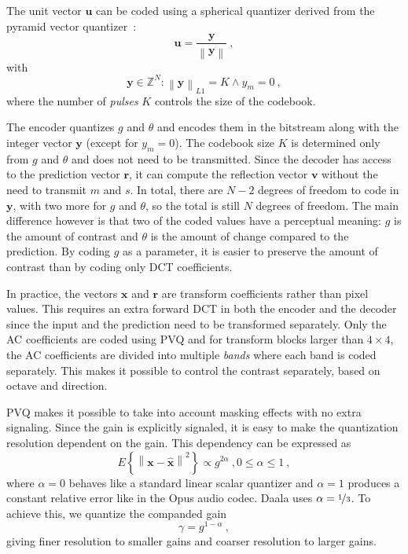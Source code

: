 \documentclass[english,conference,10pt]{IEEEtran}
\begin{document}
The unit vector $\mathbf{u}$ can be coded using a spherical quantizer derived
from the pyramid vector quantizer~\cite{Fischer1986}:
\begin{equation}
\mathbf{u}=\frac{\mathbf{y}}{\left\|\mathbf{y}\right\|}\ ,
\end{equation}
with
\begin{equation}
\mathbf{y} \in \mathbb{Z}^N : \left\|\mathbf{y}\right\|_{L1} = K \land y_m=0\ ,
\end{equation}
where the number of \textit{pulses} $K$ controls the size of the codebook.

The encoder quantizes $g$ and $\theta$ and encodes them in the bitstream along
with the integer vector $\mathbf{y}$ (except for $y_m=0$). The codebook
size $K$ is determined only from $g$ and $\theta$ and does not need to be
transmitted. Since the decoder has access to the prediction vector $\mathbf{r}$,
it can compute the reflection vector $\mathbf{v}$ without the need to transmit
$m$ and $s$. In total, there are $N-2$ degrees of freedom to code in
$\mathbf{y}$, with two more for $g$ and $\theta$, so the total is still
$N$ degrees of freedom. The main difference however is that two of the
coded values have a perceptual meaning: $g$ is the amount of contrast and
$\theta$ is the amount of change compared to the prediction. By coding $g$
as a parameter, it is easier to preserve the amount of contrast than by
coding only DCT coefficients.

In practice, the vectors $\mathbf{x}$ and $\mathbf{r}$ are transform
coefficients rather than pixel values. This requires an extra forward DCT
in both the encoder and the decoder since the input and the prediction need
to be transformed separately. Only the AC coefficients are coded using PVQ
and for transform blocks larger than $4\times 4$, the AC coefficients are divided into multiple
\textit{bands} where each band is coded separately. This makes it possible
to control the contrast separately, based on octave and direction.

PVQ makes it possible to take into account masking effects with no
extra signaling. Since the gain is explicitly signaled, it is easy to make
the quantization resolution dependent on the gain. This dependency can be
expressed as
\begin{equation}
E\left\lbrace \left\| \mathbf{x} - \hat{\mathbf{x}} \right\|^2 \right\rbrace
\propto g^{2\alpha}\ , 0 \leq \alpha \leq 1\ ,
\end{equation}
where $\alpha=0$ behaves like a standard linear scalar quantizer and
$\alpha=1$ produces a constant relative error like in the Opus audio codec.
Daala uses $\alpha = \nicefrac{1}{3}$. To achieve this, we quantize the
companded gain
\begin{equation}
\gamma = g^{1-\alpha}\ ,
\end{equation}
giving finer resolution to smaller gains and coarser resolution to larger
gains.
\end{document}
